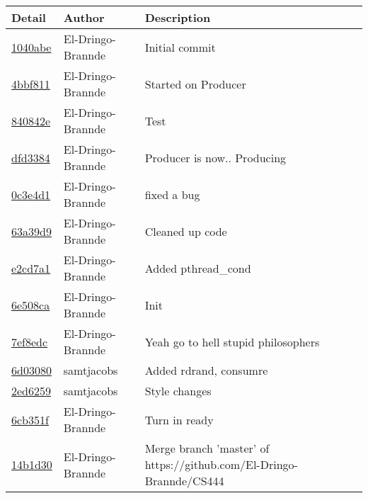 \begin{tabular}{l l l}\textbf{Detail} & \textbf{Author} & \textbf{Description}\\\hline
\href{https://github.com/El-Dringo-Brannde/CS444/commit/1040abe06276b44779d7090f4dcf3f12aa14f5ff}{1040abe} & El-Dringo-Brannde & Initial commit\\\hline
\href{https://github.com/El-Dringo-Brannde/CS444/commit/4bbf81171861f808e93ce47478cca496c0b0fe89}{4bbf811} & El-Dringo-Brannde & Started on Producer\\\hline
\href{https://github.com/El-Dringo-Brannde/CS444/commit/840842e72c16c3dd8c5a4971e0ce27ce91b65e69}{840842e} & El-Dringo-Brannde & Test\\\hline
\href{https://github.com/El-Dringo-Brannde/CS444/commit/dfd33841d968202f1a7e17cad93e5171b0686031}{dfd3384} & El-Dringo-Brannde & Producer is now.. Producing\\\hline
\href{https://github.com/El-Dringo-Brannde/CS444/commit/0c3e4d1e938f4b736ec4c0db4342038bd5dbc06a}{0c3e4d1} & El-Dringo-Brannde & fixed a bug\\\hline
\href{https://github.com/El-Dringo-Brannde/CS444/commit/63a39d9f2c3d49abb6fcdd5bfc623eb6ac356553}{63a39d9} & El-Dringo-Brannde & Cleaned up code\\\hline
\href{https://github.com/El-Dringo-Brannde/CS444/commit/e2cd7a11800994774664033637c8bcd272c74500}{e2cd7a1} & El-Dringo-Brannde & Added pthread_cond\\\hline
\href{https://github.com/El-Dringo-Brannde/CS444/commit/6e508cad4770626bda31e3f012b218896bf1cf7c}{6e508ca} & El-Dringo-Brannde & Init\\\hline
\href{https://github.com/El-Dringo-Brannde/CS444/commit/7ef8edc8e4f22f96c3244cd9075975966d6096c0}{7ef8edc} & El-Dringo-Brannde & Yeah go to hell stupid philosophers\\\hline
\href{https://github.com/El-Dringo-Brannde/CS444/commit/6d030800ec382b329314ca25581e016269790a0c}{6d03080} & samtjacobs & Added rdrand, consumre\\\hline
\href{https://github.com/El-Dringo-Brannde/CS444/commit/2ed62596d4850551f192b7e5b8175e69526b1bd8}{2ed6259} & samtjacobs & Style changes\\\hline
\href{https://github.com/El-Dringo-Brannde/CS444/commit/6cb351f9c34417f60e7f8d71a179d2eb09c335b4}{6cb351f} & El-Dringo-Brannde & Turn in ready\\\hline
\href{https://github.com/El-Dringo-Brannde/CS444/commit/14b1d306e9d1f67d1826a2e3264f9e88ecc7aca2}{14b1d30} & El-Dringo-Brannde & Merge branch 'master' of https://github.com/El-Dringo-Brannde/CS444\\\hline

\end{tabular}
